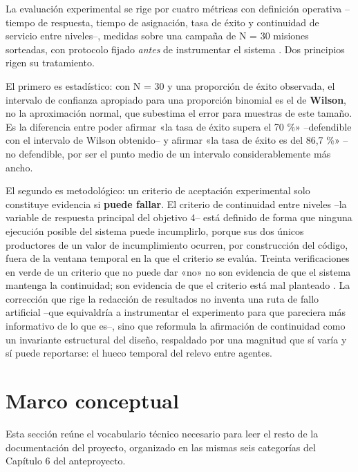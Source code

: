 \documentclass[12pt,letterpaper]{article}
\begin{document}
La evaluación experimental se rige por cuatro métricas con definición operativa --tiempo de respuesta, tiempo de asignación, tasa de éxito y continuidad de servicio entre niveles--, medidas sobre una campaña de N = 30 misiones sorteadas, con protocolo fijado \textit{antes} de instrumentar el sistema \cite{protocolo_experimental}. Dos principios rigen su tratamiento.

El primero es estadístico: con N = 30 y una proporción de éxito observada, el intervalo de confianza apropiado para una proporción binomial es el de \textbf{Wilson}, no la aproximación normal, que subestima el error para muestras de este tamaño. Es la diferencia entre poder afirmar «la tasa de éxito supera el 70 \%» --defendible con el intervalo de Wilson obtenido-- y afirmar «la tasa de éxito es del 86,7 \%» --no defendible, por ser el punto medio de un intervalo considerablemente más ancho.

El segundo es metodológico: un criterio de aceptación experimental solo constituye evidencia si \textbf{puede fallar}. El criterio de continuidad entre niveles --la variable de respuesta principal del objetivo 4-- está definido de forma que ninguna ejecución posible del sistema puede incumplirlo, porque sus dos únicos productores de un valor de incumplimiento ocurren, por construcción del código, fuera de la ventana temporal en la que el criterio se evalúa. Treinta verificaciones en verde de un criterio que no puede dar «no» no son evidencia de que el sistema mantenga la continuidad; son evidencia de que el criterio está mal planteado \cite{barrido_falsabilidad}. La corrección que rige la redacción de resultados no inventa una ruta de fallo artificial --que equivaldría a instrumentar el experimento para que pareciera más informativo de lo que es--, sino que reformula la afirmación de continuidad como un invariante estructural del diseño, respaldado por una magnitud que sí varía y sí puede reportarse: el hueco temporal del relevo entre agentes.

\section{Marco conceptual}
\label{sec:marco_conceptual}

Esta sección reúne el vocabulario técnico necesario para leer el resto de la documentación del proyecto, organizado en las mismas seis categorías del Capítulo 6 del anteproyecto.
\end{document}
